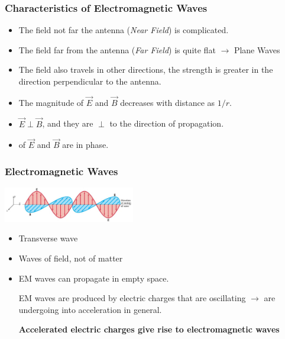 \documentclass[]{beamer}
\begin{document}
\begin{frame}
\frametitle{Characteristics of Electromagnetic Waves}

\begin{itemize}

\item The field not far the antenna (\textit{Near Field}) is complicated.
\pause

\item The field far from the antenna (\textit{Far Field}) is quite flat $\rightarrow$ Plane Waves
\pause

\item The field also travels in other directions, the strength is greater in the direction perpendicular to the antenna.
\pause

\item The magnitude of $\vec{E}$ and $\vec{B}$ decreases with distance as $1/r$.
\pause

\item $\vec{E}\perp\vec{B}$, and they are $\perp$ to the direction of propagation.
\pause

\item  of $\vec{E}$ and $\vec{B}$ are in phase.

\end{itemize}

  \end{frame}





\begin{frame}
\frametitle{ Electromagnetic Waves}


 \begin{center}
  \includegraphics[height=0.6in]{images5/EMwave.jpg}
\end{center}


\begin{itemize}

 

\item Transverse wave
\pause 
\item Waves of field, not of matter
\pause
\item EM waves can propagate in empty space.

\pause
\vspace{3mm}
\pause

EM waves are produced by electric charges that are oscillating $\rightarrow$ are undergoing into acceleration in general.
\pause
\vspace{3mm}

\textbf{Accelerated electric charges give rise to electromagnetic waves}

\end{itemize}

  \end{frame}
\end{document}
